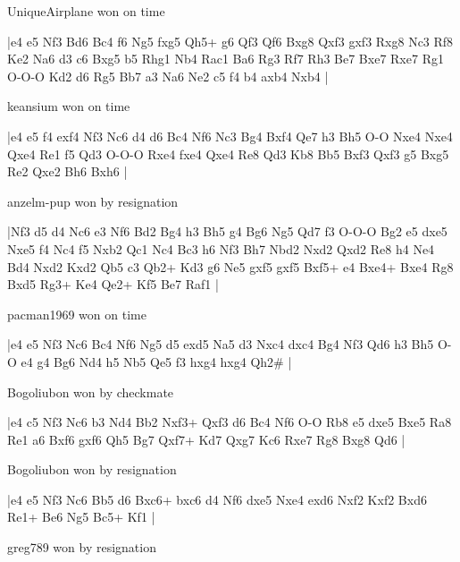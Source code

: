 UniqueAirplane won on time

\makegametitle
|e4 e5 Nf3 Bd6 Bc4 f6 Ng5 fxg5 Qh5+ g6 Qf3 Qf6 Bxg8 Qxf3 gxf3 Rxg8 Nc3 Rf8 Ke2 Na6 d3 c6 Bxg5 b5 Rhg1 Nb4 Rac1 Ba6 Rg3 Rf7 Rh3 Be7 Bxe7 Rxe7 Rg1 O-O-O Kd2 d6 Rg5 Bb7 a3 Na6 Ne2 c5 f4 b4 axb4 Nxb4  |

\showboard

keansium won on time

\makegametitle
|e4 e5 f4 exf4 Nf3 Nc6 d4 d6 Bc4 Nf6 Nc3 Bg4 Bxf4 Qe7 h3 Bh5 O-O Nxe4 Nxe4 Qxe4 Re1 f5 Qd3 O-O-O Rxe4 fxe4 Qxe4 Re8 Qd3 Kb8 Bb5 Bxf3 Qxf3 g5 Bxg5 Re2 Qxe2 Bh6 Bxh6  |

\showboard

anzelm-pup won by resignation

\makegametitle
|Nf3 d5 d4 Nc6 e3 Nf6 Bd2 Bg4 h3 Bh5 g4 Bg6 Ng5 Qd7 f3 O-O-O Bg2 e5 dxe5 Nxe5 f4 Nc4 f5 Nxb2 Qc1 Nc4 Bc3 h6 Nf3 Bh7 Nbd2 Nxd2 Qxd2 Re8 h4 Ne4 Bd4 Nxd2 Kxd2 Qb5 c3 Qb2+ Kd3 g6 Ne5 gxf5 gxf5 Bxf5+ e4 Bxe4+ Bxe4 Rg8 Bxd5 Rg3+ Ke4 Qe2+ Kf5 Be7 Raf1  |

\showboard

pacman1969 won on time

\makegametitle
|e4 e5 Nf3 Nc6 Bc4 Nf6 Ng5 d5 exd5 Na5 d3 Nxc4 dxc4 Bg4 Nf3 Qd6 h3 Bh5 O-O e4 g4 Bg6 Nd4 h5 Nb5 Qe5 f3 hxg4 hxg4 Qh2\#  |

\showboard

Bogoliubon won by checkmate

\makegametitle
|e4 c5 Nf3 Nc6 b3 Nd4 Bb2 Nxf3+ Qxf3 d6 Bc4 Nf6 O-O Rb8 e5 dxe5 Bxe5 Ra8 Re1 a6 Bxf6 gxf6 Qh5 Bg7 Qxf7+ Kd7 Qxg7 Kc6 Rxe7 Rg8 Bxg8 Qd6  |

\showboard

Bogoliubon won by resignation

\makegametitle
|e4 e5 Nf3 Nc6 Bb5 d6 Bxc6+ bxc6 d4 Nf6 dxe5 Nxe4 exd6 Nxf2 Kxf2 Bxd6 Re1+ Be6 Ng5 Bc5+ Kf1  |

\showboard

greg789 won by resignation

